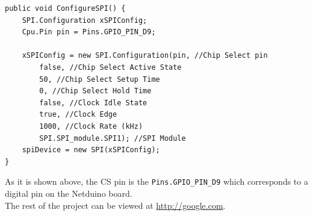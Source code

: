 \begin{lstlisting}[language=CSharp, caption={SPIApi.cs - Configuring SPI for the MFRC522 in Netduino Plus}]
public void ConfigureSPI() {
    SPI.Configuration xSPIConfig;
    Cpu.Pin pin = Pins.GPIO_PIN_D9;

    xSPIConfig = new SPI.Configuration(pin, //Chip Select pin
        false, //Chip Select Active State
        50, //Chip Select Setup Time
        0, //Chip Select Hold Time
        false, //Clock Idle State
        true, //Clock Edge
        1000, //Clock Rate (kHz)
        SPI.SPI_module.SPI1); //SPI Module
    spiDevice = new SPI(xSPIConfig);
}
\end{lstlisting}
As it is shown above, the \gls{CS} pin is the \verb!Pins.GPIO_PIN_D9! which corresponds to a digital pin on the Netduino board.
\\
The rest of the project can be viewed at \url{http://google.com}.

